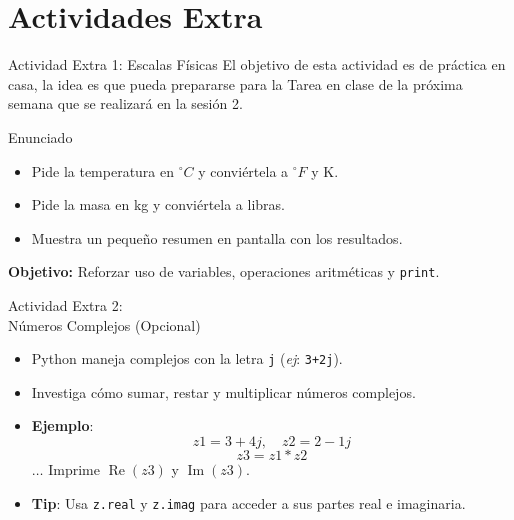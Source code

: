 \documentclass[10pt]{beamer}
\begin{document}
\section{Actividades Extra}

\begin{frame}{Actividad Extra 1: Escalas Físicas}
  El objetivo de esta actividad es de práctica en casa, la idea es que pueda prepararse para la Tarea en clase de la próxima semana que se realizará en la sesión 2.
  \begin{block}{Enunciado}
    \begin{itemize}
      \item Pide la temperatura en \(^\circ C\) y conviértela a \(^\circ F\) y K.
      \item Pide la masa en kg y conviértela a libras.
      \item Muestra un pequeño resumen en pantalla con los resultados.
    \end{itemize}
  \end{block}
  \textbf{Objetivo:} Reforzar uso de variables, operaciones aritméticas y \texttt{print}.
\end{frame}

\begin{frame}{Actividad Extra 2: \\ Números Complejos (Opcional)}
  \begin{itemize}
    \item Python maneja complejos con la letra \texttt{j} (\emph{ej}: \texttt{3+2j}).
    \item Investiga cómo sumar, restar y multiplicar números complejos.
    \item \textbf{Ejemplo}:
      \[
        z1 = 3 + 4j, \quad z2 = 2 - 1j
      \]
      \[
        z3 = z1 * z2
      \]
      \(\dots\) Imprime \(\operatorname{Re}(z3)\) y \(\operatorname{Im}(z3)\).
    \item \textbf{Tip}: Usa \texttt{z.real} y \texttt{z.imag} para acceder a sus partes real e imaginaria.
  \end{itemize}
\end{frame}
\end{document}
